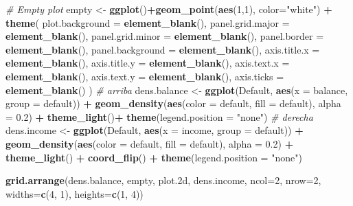 \documentclass[]{book}
\newenvironment{Shaded}{\begin{snugshade}}{\end{snugshade}}
\newcommand{\CommentTok}[1]{\textcolor[rgb]{0.56,0.35,0.01}{\textit{#1}}}
\newcommand{\DataTypeTok}[1]{\textcolor[rgb]{0.13,0.29,0.53}{#1}}
\newcommand{\DecValTok}[1]{\textcolor[rgb]{0.00,0.00,0.81}{#1}}
\newcommand{\FloatTok}[1]{\textcolor[rgb]{0.00,0.00,0.81}{#1}}
\newcommand{\KeywordTok}[1]{\textcolor[rgb]{0.13,0.29,0.53}{\textbf{#1}}}
\newcommand{\NormalTok}[1]{#1}
\newcommand{\OperatorTok}[1]{\textcolor[rgb]{0.81,0.36,0.00}{\textbf{#1}}}
\newcommand{\StringTok}[1]{\textcolor[rgb]{0.31,0.60,0.02}{#1}}
\begin{document}
\begin{Shaded}
\begin{Highlighting}[]
\CommentTok{# Empty plot}
\NormalTok{empty <-}\StringTok{ }\KeywordTok{ggplot}\NormalTok{()}\OperatorTok{+}\KeywordTok{geom_point}\NormalTok{(}\KeywordTok{aes}\NormalTok{(}\DecValTok{1}\NormalTok{,}\DecValTok{1}\NormalTok{), }\DataTypeTok{color=}\StringTok{"white"}\NormalTok{) }\OperatorTok{+}
\StringTok{  }\KeywordTok{theme}\NormalTok{(}
    \DataTypeTok{plot.background =} \KeywordTok{element_blank}\NormalTok{(),}
    \DataTypeTok{panel.grid.major =} \KeywordTok{element_blank}\NormalTok{(),}
    \DataTypeTok{panel.grid.minor =} \KeywordTok{element_blank}\NormalTok{(),}
    \DataTypeTok{panel.border =} \KeywordTok{element_blank}\NormalTok{(),}
    \DataTypeTok{panel.background =} \KeywordTok{element_blank}\NormalTok{(),}
    \DataTypeTok{axis.title.x =} \KeywordTok{element_blank}\NormalTok{(),}
    \DataTypeTok{axis.title.y =} \KeywordTok{element_blank}\NormalTok{(),}
    \DataTypeTok{axis.text.x =} \KeywordTok{element_blank}\NormalTok{(),}
    \DataTypeTok{axis.text.y =} \KeywordTok{element_blank}\NormalTok{(),}
    \DataTypeTok{axis.ticks =} \KeywordTok{element_blank}\NormalTok{()}
\NormalTok{  )}
\CommentTok{# arriba}
\NormalTok{dens.balance <-}\StringTok{ }\KeywordTok{ggplot}\NormalTok{(Default, }\KeywordTok{aes}\NormalTok{(}\DataTypeTok{x =}\NormalTok{ balance, }\DataTypeTok{group =}\NormalTok{ default)) }\OperatorTok{+}
\StringTok{  }\KeywordTok{geom_density}\NormalTok{(}\KeywordTok{aes}\NormalTok{(}\DataTypeTok{color =}\NormalTok{ default, }\DataTypeTok{fill =}\NormalTok{ default), }\DataTypeTok{alpha =} \FloatTok{0.2}\NormalTok{) }\OperatorTok{+}
\StringTok{  }\KeywordTok{theme_light}\NormalTok{()}\OperatorTok{+}
\StringTok{  }\KeywordTok{theme}\NormalTok{(}\DataTypeTok{legend.position =} \StringTok{"none"}\NormalTok{)}
\CommentTok{# derecha}
\NormalTok{dens.income <-}\StringTok{ }\KeywordTok{ggplot}\NormalTok{(Default, }\KeywordTok{aes}\NormalTok{(}\DataTypeTok{x =}\NormalTok{ income, }\DataTypeTok{group =}\NormalTok{ default)) }\OperatorTok{+}
\StringTok{  }\KeywordTok{geom_density}\NormalTok{(}\KeywordTok{aes}\NormalTok{(}\DataTypeTok{color =}\NormalTok{ default, }\DataTypeTok{fill =}\NormalTok{ default), }\DataTypeTok{alpha =} \FloatTok{0.2}\NormalTok{) }\OperatorTok{+}
\StringTok{  }\KeywordTok{theme_light}\NormalTok{() }\OperatorTok{+}\StringTok{ }\KeywordTok{coord_flip}\NormalTok{() }\OperatorTok{+}
\StringTok{  }\KeywordTok{theme}\NormalTok{(}\DataTypeTok{legend.position =} \StringTok{"none"}\NormalTok{)}

\KeywordTok{grid.arrange}\NormalTok{(dens.balance, empty, plot}\FloatTok{.2}\NormalTok{d, dens.income, }\DataTypeTok{ncol=}\DecValTok{2}\NormalTok{, }\DataTypeTok{nrow=}\DecValTok{2}\NormalTok{, }\DataTypeTok{widths=}\KeywordTok{c}\NormalTok{(}\DecValTok{4}\NormalTok{, }\DecValTok{1}\NormalTok{), }\DataTypeTok{heights=}\KeywordTok{c}\NormalTok{(}\DecValTok{1}\NormalTok{, }\DecValTok{4}\NormalTok{))}
\end{Highlighting}
\end{Shaded}
\end{document}
